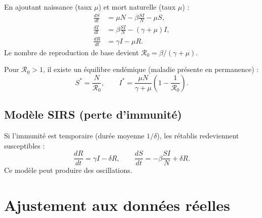 \begin{definition}
En ajoutant naissance (taux $\mu$) et mort naturelle (taux $\mu$) :
\begin{align}
  \frac{dS}{dt} &= \mu N - \beta\frac{SI}{N} - \mu S, \\
  \frac{dI}{dt} &= \beta\frac{SI}{N} - (\gamma+\mu) I, \\
  \frac{dR}{dt} &= \gamma I - \mu R.
\end{align}
Le nombre de reproduction de base devient
$\mathcal{R}_0 = \beta/(\gamma+\mu)$.
\end{definition}

\begin{proposition}
Pour $\mathcal{R}_0 > 1$, il existe un \'equilibre end\'emique
(maladie pr\'esente en permanence) :
\[
  S^* = \frac{N}{\mathcal{R}_0}, \qquad
  I^* = \frac{\mu N}{\gamma+\mu}\left(1-\frac{1}{\mathcal{R}_0}\right).
\]
\end{proposition}

\subsection{Mod\`ele SIRS (perte d'immunit\'e)}

Si l'immunit\'e est temporaire (dur\'ee moyenne $1/\delta$), les
r\'etablis redeviennent susceptibles :
\[
  \frac{dR}{dt} = \gamma I - \delta R, \qquad
  \frac{dS}{dt} = -\beta\frac{SI}{N} + \delta R.
\]
Ce mod\`ele peut produire des oscillations.

\section{Ajustement aux donn\'ees r\'eelles}


